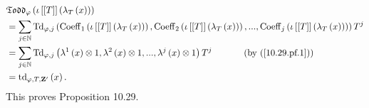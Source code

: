 \documentclass[numbers=enddot,12pt,final,onecolumn,notitlepage]{scrartcl}%
\begin{document}
\begin{align*}
&  \mathfrak{Todd}_{\varphi}\left(  \iota\left[  \left[  T\right]  \right]
\left(  \lambda_{T}\left(  x\right)  \right)  \right) \\
&  =\sum\limits_{j\in\mathbb{N}}\operatorname*{Td}\nolimits_{\varphi,j}\left(
\operatorname*{Coeff}\nolimits_{1}\left(  \iota\left[  \left[  T\right]
\right]  \left(  \lambda_{T}\left(  x\right)  \right)  \right)
,\operatorname*{Coeff}\nolimits_{2}\left(  \iota\left[  \left[  T\right]
\right]  \left(  \lambda_{T}\left(  x\right)  \right)  \right)
,...,\operatorname*{Coeff}\nolimits_{j}\left(  \iota\left[  \left[  T\right]
\right]  \left(  \lambda_{T}\left(  x\right)  \right)  \right)  \right)
T^{j}\\
&  =\sum\limits_{j\in\mathbb{N}}\operatorname*{Td}\nolimits_{\varphi,j}\left(
\lambda^{1}\left(  x\right)  \otimes1,\lambda^{2}\left(  x\right)
\otimes1,...,\lambda^{j}\left(  x\right)  \otimes1\right)  T^{j}%
\ \ \ \ \ \ \ \ \ \ \left(  \text{by (\ref{10.29.pf.1})}\right) \\
&  =\operatorname*{td}\nolimits_{\varphi,T,\mathbf{Z}^{\prime}}\left(
x\right)  .
\end{align*}
This proves Proposition 10.29.
\end{document}

